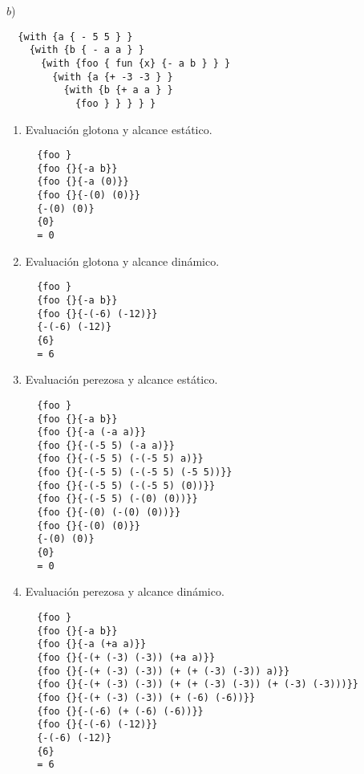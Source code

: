 \newpage
$b$) \begin{lstlisting}
  {with {a { - 5 5 } }
    {with {b { - a a } }
      {with {foo { fun {x} {- a b } } }
        {with {a {+ -3 -3 } }
          {with {b {+ a a } }
            {foo } } } } }
\end{lstlisting}

\begin{enumerate}
  \item Evaluación glotona y alcance estático.
  \begin{lstlisting}
  {foo }
  {foo {}{-a b}}
  {foo {}{-a (0)}}
  {foo {}{-(0) (0)}}
  {-(0) (0)}
  {0}
  = 0
\end{lstlisting}
  \item Evaluación glotona y alcance dinámico.
  \begin{lstlisting}
  {foo }
  {foo {}{-a b}}
  {foo {}{-(-6) (-12)}}
  {-(-6) (-12)}
  {6}
  = 6
\end{lstlisting}
  \item Evaluación perezosa y alcance estático.
  \begin{lstlisting}
  {foo }
  {foo {}{-a b}}
  {foo {}{-a (-a a)}}
  {foo {}{-(-5 5) (-a a)}}
  {foo {}{-(-5 5) (-(-5 5) a)}}
  {foo {}{-(-5 5) (-(-5 5) (-5 5))}}
  {foo {}{-(-5 5) (-(-5 5) (0))}}
  {foo {}{-(-5 5) (-(0) (0))}}
  {foo {}{-(0) (-(0) (0))}}
  {foo {}{-(0) (0)}}
  {-(0) (0)}
  {0}
  = 0
\end{lstlisting}
  \item Evaluación perezosa y alcance dinámico.
  \begin{lstlisting}
  {foo }
  {foo {}{-a b}}
  {foo {}{-a (+a a)}}
  {foo {}{-(+ (-3) (-3)) (+a a)}}
  {foo {}{-(+ (-3) (-3)) (+ (+ (-3) (-3)) a)}}
  {foo {}{-(+ (-3) (-3)) (+ (+ (-3) (-3)) (+ (-3) (-3)))}}
  {foo {}{-(+ (-3) (-3)) (+ (-6) (-6))}}
  {foo {}{-(-6) (+ (-6) (-6))}}
  {foo {}{-(-6) (-12)}}
  {-(-6) (-12)}
  {6}
  = 6


\end{lstlisting}
\end{enumerate}
